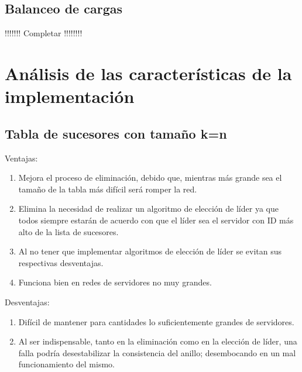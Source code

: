 \documentclass[10pt, a4paper]{article}
\begin{document}
    \subsection{Balanceo de cargas}
    !!!!!!!
    Completar
    !!!!!!!!\\
    
    \section{An\'alisis de las caracter\'isticas de la implementaci\'on}
    
    \subsection{Tabla de sucesores con tamaño k=n}
    Ventajas:
    \begin{enumerate}
    	\item Mejora el proceso de eliminación, debido que, mientras más grande sea el tamaño de la tabla más difícil será romper la red.
    	\item Elimina la necesidad de realizar un algoritmo de elección de líder ya que todos siempre estarán de acuerdo con que el líder sea el servidor con ID más alto de la lista de sucesores.
    	\item Al no tener que implementar algoritmos de elección de líder se evitan sus respectivas desventajas.
    	\item Funciona bien en redes de servidores no muy grandes.  	
    \end{enumerate}
    
    Desventajas:
    \begin{enumerate}
    	\item Difícil de mantener para cantidades lo suficientemente grandes de servidores.
    	\item Al ser indispensable, tanto en la eliminación como en la elección de líder, una falla podría desestabilizar la consistencia del anillo; desembocando en un mal funcionamiento del mismo.   	
    \end{enumerate}
\end{document}
